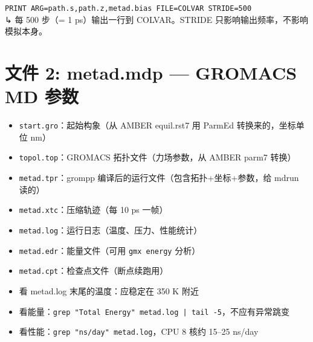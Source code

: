 \documentclass[11pt,a4paper]{article}
\begin{document}
\vspace{8pt}

\noindent\texttt{\textcolor{paramcolor}{PRINT ARG=path.s,path.z,metad.bias FILE=COLVAR STRIDE=500}}\\
\textcolor{notecolor}{↳ 每 500 步（= 1 ps）输出一行到 COLVAR。STRIDE 只影响输出频率，不影响模拟本身。}

\newpage
\section{文件 2: metad.mdp — GROMACS MD 参数}

\begin{iobox}[输入文件]
\begin{itemize}[nosep]
\item \texttt{start.gro}：起始构象（从 AMBER equil.rst7 用 ParmEd 转换来的，坐标单位 nm）
\item \texttt{topol.top}：GROMACS 拓扑文件（力场参数，从 AMBER parm7 转换）
\end{itemize}
\end{iobox}

\begin{iobox}[输出文件]
\begin{itemize}[nosep]
\item \texttt{metad.tpr}：grompp 编译后的运行文件（包含拓扑+坐标+参数，给 mdrun 读的）
\item \texttt{metad.xtc}：压缩轨迹（每 10 ps 一帧）
\item \texttt{metad.log}：运行日志（温度、压力、性能统计）
\item \texttt{metad.edr}：能量文件（可用 \texttt{gmx energy} 分析）
\item \texttt{metad.cpt}：检查点文件（断点续跑用）
\end{itemize}
\end{iobox}

\begin{iobox}[怎么确认文件是对的]
\begin{itemize}[nosep]
\item 看 metad.log 末尾的温度：应稳定在 350 K 附近
\item 看能量：\texttt{grep "Total Energy" metad.log | tail -5}，不应有异常跳变
\item 看性能：\texttt{grep "ns/day" metad.log}，CPU 8 核约 15--25 ns/day
\end{itemize}
\end{iobox}
\end{document}
